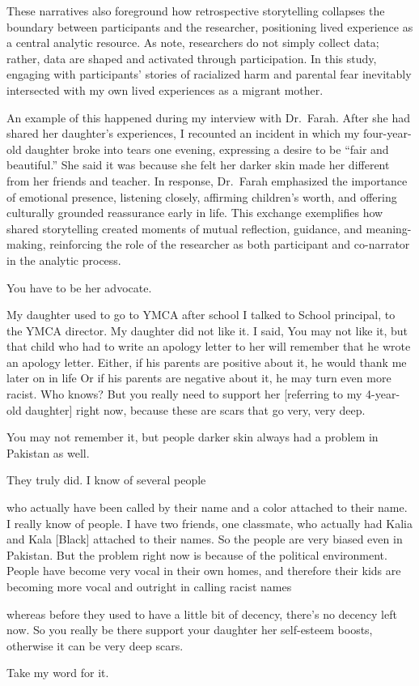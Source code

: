 These narratives also foreground how retrospective storytelling collapses the boundary between participants and the researcher, positioning lived experience as a central analytic resource. As \citet[p.~5]{ellingsonMakingDataQualitative2020} note, researchers do not simply collect data; rather, data are shaped and activated through participation. In this study, engaging with participants’ stories of racialized harm and parental fear inevitably intersected with my own lived experiences as a migrant mother.

An example of this happened during my interview with Dr.~Farah. After she had shared her daughter’s experiences, I recounted an incident in which my four-year-old daughter broke into tears one evening, expressing a desire to be ``fair and beautiful.'' She said it was because she felt her darker skin made her different from her friends and teacher. In response, Dr.~Farah emphasized the importance of emotional presence, listening closely, affirming children’s worth, and offering culturally grounded reassurance early in life. This exchange exemplifies how shared storytelling created moments of mutual reflection, guidance, and meaning-making, reinforcing the role of the researcher as both participant and co-narrator in the analytic process.

\begin{FoundPoem}
You have to be her advocate.

        My daughter used to go to YMCA
                                        after school
I           talked to
School principal, 
                        to the YMCA director.
My daughter did not like it.
I said,
You may not like it, but that child who had to write an apology letter to her
will remember that he wrote an apology letter.
Either,   	if his parents are positive about it,
he would thank me later on in life
Or
 if his parents are negative about it, he may turn even more racist.
Who knows?
But you really need to support her [referring to my 4-year-old daughter] right
now,
because these are scars that go very, very deep.

You may not remember it,
but people       darker skin
always had a problem in Pakistan as well.

They truly did.
I know of several people

who actually have been called
by their name
and a color attached                           to their name.
I really know of people.
I  have two friends,
one classmate,
who actually had Kalia and Kala [Black]
attached to their names.
So the people are very biased
even in Pakistan.
But the problem right now
is because of the political environment.
People have become very vocal
in their own homes,
and therefore their kids
are becoming more vocal
and outright in calling racist names

whereas before
                they used to have a little bit of decency,
there's no decency left now.
So you really 			be there
 	support your daughter
                            her       self-esteem boosts,
otherwise it can be very deep scars.

Take my word for it.
\end{FoundPoem}

